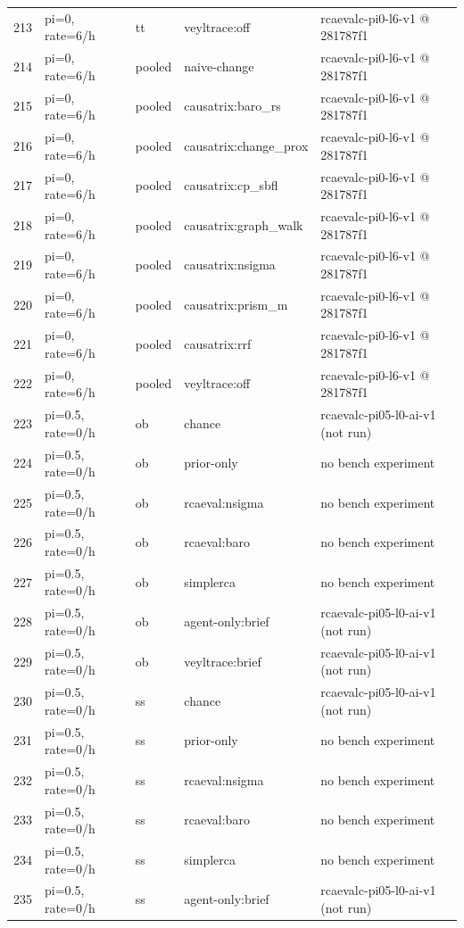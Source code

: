 \begin{longtable}{@{}r>{\raggedright\arraybackslash}p{48.0pt}>{\raggedright\arraybackslash}p{18.0pt}>{\raggedright\arraybackslash}p{108.0pt}>{\raggedright\arraybackslash}p{105.0pt}@{}}
213 & pi=0, rate=6/h & tt & veyltrace:off & rcaevalc-pi0-l6-v1 @ 281787f1 \\
214 & pi=0, rate=6/h & pooled & naive-change & rcaevalc-pi0-l6-v1 @ 281787f1 \\
215 & pi=0, rate=6/h & pooled & causatrix:baro\_rs & rcaevalc-pi0-l6-v1 @ 281787f1 \\
216 & pi=0, rate=6/h & pooled & causatrix:change\_prox & rcaevalc-pi0-l6-v1 @ 281787f1 \\
217 & pi=0, rate=6/h & pooled & causatrix:cp\_sbfl & rcaevalc-pi0-l6-v1 @ 281787f1 \\
218 & pi=0, rate=6/h & pooled & causatrix:graph\_walk & rcaevalc-pi0-l6-v1 @ 281787f1 \\
219 & pi=0, rate=6/h & pooled & causatrix:nsigma & rcaevalc-pi0-l6-v1 @ 281787f1 \\
220 & pi=0, rate=6/h & pooled & causatrix:prism\_m & rcaevalc-pi0-l6-v1 @ 281787f1 \\
221 & pi=0, rate=6/h & pooled & causatrix:rrf & rcaevalc-pi0-l6-v1 @ 281787f1 \\
222 & pi=0, rate=6/h & pooled & veyltrace:off & rcaevalc-pi0-l6-v1 @ 281787f1 \\
223 & pi=0.5, rate=0/h & ob & chance & rcaevalc-pi05-l0-ai-v1 (not run) \\
224 & pi=0.5, rate=0/h & ob & prior-only & no bench experiment \\
225 & pi=0.5, rate=0/h & ob & rcaeval:nsigma & no bench experiment \\
226 & pi=0.5, rate=0/h & ob & rcaeval:baro & no bench experiment \\
227 & pi=0.5, rate=0/h & ob & simplerca & no bench experiment \\
228 & pi=0.5, rate=0/h & ob & agent-only:brief & rcaevalc-pi05-l0-ai-v1 (not run) \\
229 & pi=0.5, rate=0/h & ob & veyltrace:brief & rcaevalc-pi05-l0-ai-v1 (not run) \\
230 & pi=0.5, rate=0/h & ss & chance & rcaevalc-pi05-l0-ai-v1 (not run) \\
231 & pi=0.5, rate=0/h & ss & prior-only & no bench experiment \\
232 & pi=0.5, rate=0/h & ss & rcaeval:nsigma & no bench experiment \\
233 & pi=0.5, rate=0/h & ss & rcaeval:baro & no bench experiment \\
234 & pi=0.5, rate=0/h & ss & simplerca & no bench experiment \\
235 & pi=0.5, rate=0/h & ss & agent-only:brief & rcaevalc-pi05-l0-ai-v1 (not run) \\

\end{longtable}
